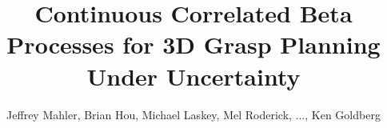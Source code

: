 \documentclass[letterpaper, 10 pt, conference]{ieeeconf}  %
\begin{document}
\title{\LARGE \bf Continuous Correlated Beta Processes for 3D Grasp Planning Under Uncertainty
	}
\author{Jeffrey Mahler, Brian Hou, Michael Laskey, Mel Roderick, ..., Ken Goldberg}
\maketitle

%
%


%


%
%
%
%

%



\end{document}
